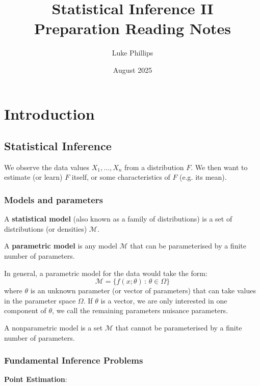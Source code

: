 \documentclass[10pt, a4paper]{article}
\title{Statistical Inference II \\
    \large Preparation Reading Notes}
\author{Luke Phillips}
\date{August 2025}
\begin{document}
\maketitle

\newpage

\tableofcontents

\newpage

\section{Introduction}

\subsection{Statistical Inference}

\begin{definition}
    We observe the data values $X_1, \dotsc, X_n$ from a distribution $F$.
    We then want to estimate
    (or learn)
    $F$ itself,
    or some characteristics of $F$
    (e.g. its mean).
\end{definition}

\subsubsection{Models and parameters}
A \textbf{statistical model}
(also known as a family of distributions)
is a set of distributions
(or densities)
$\mathcal{M}$.

A \textbf{parametric model} is any model $\mathcal{M}$ that can be parameterised by a finite number of parameters.

In general,
a parametric model for the data would take the form:
\[
\mathcal{M} = \{f(x; \theta)\,:\,\theta \in \Omega\}
\]
where $\theta$ is an unknown parameter
(or vector of parameters)
that can take values in the parameter space $\Omega$.
If $\theta$ is a vector,
we are only interested in one component of $\theta$,
we call the remaining parameters nuisance parameters.

A nonparametric model is a set $\mathcal{M}$ that cannot be parameterised by a finite number of parameters.

\subsubsection{Fundamental Inference Problems}

\textbf{Point Estimation}:
\end{document}
